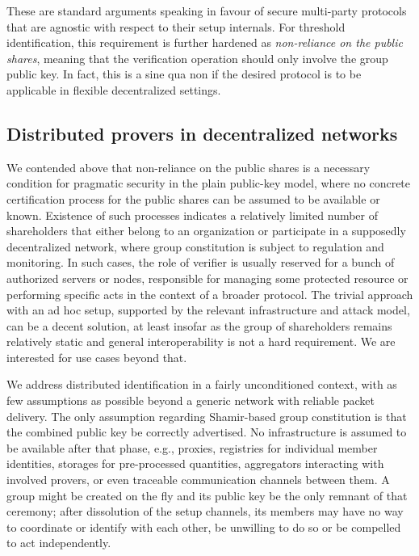 \documentclass[10pt, psamsfonts, reqno]{amsart}
\theoremstyle{definition}
\theoremstyle{remark}
\numberwithin{equation}{section}
\begin{document}
These are standard arguments speaking in favour
of secure multi-party protocols that are agnostic
with respect to their setup internals.
For threshold identification,
this requirement is further hardened as
\textit{non-reliance on the public shares},
meaning that the verification operation should only involve
the group public key.
In fact, this is a sine qua non if the desired protocol is
to be applicable in flexible decentralized settings.


\subsection{Distributed provers in decentralized networks}\label{section_distributed_provers}

We contended above that non-reliance on the public shares
is a necessary condition for pragmatic security
in the plain public-key model, where
no concrete certification process
for the public shares can be assumed
to be available or known.
Existence of such processes indicates
a relatively limited number of shareholders
that either belong to an organization or participate
in a supposedly decentralized network,
where group constitution is subject to
regulation and monitoring.
In such cases,
the role of verifier is usually reserved for
a bunch of authorized servers or nodes,
responsible for managing some protected resource or
performing specific acts in the context of a broader protocol.
The trivial approach with an ad hoc setup,
supported by the relevant infrastructure
and attack model,
can be a decent solution,
at least insofar as the group of shareholders
remains relatively static
and general interoperability
is not a hard requirement.
We are interested for use cases beyond that.

We address distributed identification in
a fairly unconditioned context,
with as few assumptions as possible
beyond a generic network
with reliable packet delivery.
The only assumption regarding
Shamir-based group constitution is that
the combined public key
be correctly advertised.
No infrastructure is
assumed to be available after that phase,
e.g., proxies, registries for individual member identities,
storages for pre-processed quantities,
aggregators interacting with involved provers,
or even traceable communication channels between them.
A group might be created on the fly and its public key
be the only remnant of that ceremony;
after dissolution of the setup channels,
its members may have no way to coordinate or identify
with each other, be unwilling to do so or be compelled to
act independently.
\end{document}

